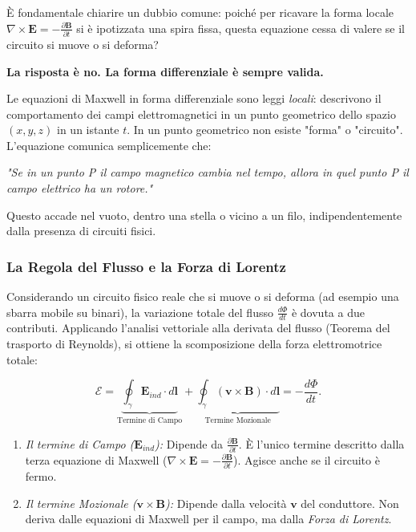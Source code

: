 \documentclass[a4paper,11pt]{report}
\begin{document}
\begin{approfondimento}[colback=white, colframe=blue!60, no shadow, title=Validità generale della legge di Faraday-Neumann-Lenz]

È fondamentale chiarire un dubbio comune: poiché per ricavare la forma locale $\nabla \times \bm{E} = -\frac{\partial \bm{B}}{\partial t}$ si è ipotizzata una spira fissa, questa equazione cessa di valere se il circuito si muove o si deforma?

\textbf{La risposta è no. La forma differenziale è sempre valida.}

Le equazioni di Maxwell in forma differenziale sono leggi \textit{locali}: descrivono il comportamento dei campi elettromagnetici in un punto geometrico dello spazio $(x,y,z)$ in un istante $t$. In un punto geometrico non esiste "forma" o "circuito". L'equazione comunica semplicemente che:
\begin{center}
    \textit{"Se in un punto P il campo magnetico cambia nel tempo, allora in quel punto P il campo elettrico ha un rotore."}
\end{center}
Questo accade nel vuoto, dentro una stella o vicino a un filo, indipendentemente dalla presenza di circuiti fisici.

\subsubsection{La Regola del Flusso e la Forza di Lorentz}
Considerando un circuito fisico reale che si muove o si deforma (ad esempio una sbarra mobile su binari), la variazione totale del flusso $\frac{d\Phi}{dt}$ è dovuta a due contributi.
Applicando l'analisi vettoriale alla derivata del flusso (Teorema del trasporto di Reynolds), si ottiene la scomposizione della forza elettromotrice totale:

\begin{equation}
   \mathcal{E} = \underbrace{\oint_{\gamma} \bm{E}_{ind} \cdot d\bm{l}}_{\text{Termine di Campo}} + \underbrace{\oint_{\gamma} (\bm{v} \times \bm{B}) \cdot d\bm{l}}_{\text{Termine Mozionale}} = - \frac{d\Phi}{dt}.
\end{equation}

\begin{enumerate}
    \item \textit{Il termine di Campo ($\bm{E}_{ind}$):} Dipende da $\frac{\partial \bm{B}}{\partial t}$. È l'unico termine descritto dalla terza equazione di Maxwell ($\nabla \times \bm{E} = -\frac{\partial \bm{B}}{\partial t}$). Agisce anche se il circuito è fermo.
    \item \textit{Il termine Mozionale ($\bm{v} \times \bm{B}$):} Dipende dalla velocità $\bm{v}$ del conduttore. Non deriva dalle equazioni di Maxwell per il campo, ma dalla \textit{Forza di Lorentz}.
\end{enumerate}


\end{approfondimento}
\end{document}
